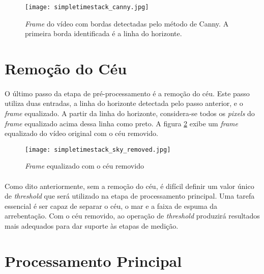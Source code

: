 
\begin{figure}[h]
  \centering
  \texttt{[image: simpletimestack\_canny.jpg]}
  \caption[\small{\textit{Frame} do vídeo com bordas detectadas pelo método de Canny. A primeira borda identificada é a linha do horizonte.}]{\small{\textit{Frame} do vídeo com bordas detectadas pelo método de Canny. A primeira borda identificada é a linha do horizonte.}}
  \label{FigFrameCanny}
\end{figure}

\section{Remoção do Céu}

\paragraph{}O último passo da etapa de pré-processamento é a remoção do céu. Este passo utiliza duas entradas, a linha do horizonte detectada pelo passo anterior, e o \textit{frame} equalizado. A partir da linha do horizonte, considera-se todos os \textit{pixels} do \textit{frame} equalizado acima dessa linha como preto. A figura \ref{FigFrameSkyRemoved} exibe um \textit{frame} equalizado do vídeo original com o céu removido.

\begin{figure}[h]
  \centering
  \texttt{[image: simpletimestack\_sky\_removed.jpg]}
  \caption[\small{\textit{Frame} equalizado com o céu removido}]{\small{\textit{Frame} equalizado com o céu removido}}
  \label{FigFrameSkyRemoved}
\end{figure}

\paragraph{}Como dito anteriormente, sem a remoção do céu, é difícil definir um valor único de \textit{threshold} que será utilizado na etapa de processamento principal. Uma tarefa essencial é ser capaz de separar o céu, o mar e a faixa de espuma da arrebentação. Com o céu removido, ao operação de \textit{threshold} produzirá resultados mais adequados para dar suporte às etapas de medição.

\section{Processamento Principal}

